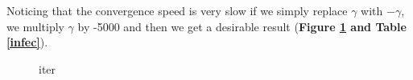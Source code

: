 \documentclass[12pt]{article}
\begin{document}
Noticing that the convergence speed is very slow if we simply replace $\gamma$ with $-\gamma$, we multiply $\gamma$ by -5000 and then we get a desirable result (\textbf{Figure \ref{iter} and Table \ref{infec}}).

\begin{figure}[h]
\centering
{}
\caption{iter}
\label{iter}
\end{figure}
\end{document}
